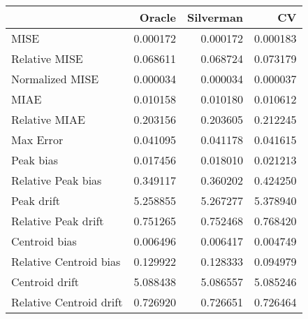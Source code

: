 \begin{tabular}{lrrr}
  \hline
 & Oracle & Silverman & CV \\ 
  \hline
MISE & 0.000172 & 0.000172 & 0.000183 \\ 
  Relative MISE & 0.068611 & 0.068724 & 0.073179 \\ 
  Normalized MISE & 0.000034 & 0.000034 & 0.000037 \\ 
  MIAE & 0.010158 & 0.010180 & 0.010612 \\ 
  Relative MIAE & 0.203156 & 0.203605 & 0.212245 \\ 
  Max Error & 0.041095 & 0.041178 & 0.041615 \\ 
  Peak bias & 0.017456 & 0.018010 & 0.021213 \\ 
  Relative Peak bias & 0.349117 & 0.360202 & 0.424250 \\ 
  Peak drift & 5.258855 & 5.267277 & 5.378940 \\ 
  Relative Peak drift & 0.751265 & 0.752468 & 0.768420 \\ 
  Centroid bias & 0.006496 & 0.006417 & 0.004749 \\ 
  Relative Centroid bias & 0.129922 & 0.128333 & 0.094979 \\ 
  Centroid drift & 5.088438 & 5.086557 & 5.085246 \\ 
  Relative Centroid drift & 0.726920 & 0.726651 & 0.726464 \\ 
   \hline
\end{tabular}

